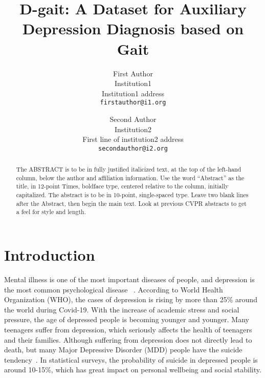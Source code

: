 \documentclass[10pt,twocolumn,letterpaper]{article}
\def\confName{CVPR}
\begin{document}
\title{D-gait: A Dataset for Auxiliary Depression Diagnosis based on Gait}

\author{First Author\\
Institution1\\
Institution1 address\\
{\tt\small firstauthor@i1.org}
\and
Second Author\\
Institution2\\
First line of institution2 address\\
{\tt\small secondauthor@i2.org}
}
\maketitle

\begin{abstract}
   The ABSTRACT is to be in fully justified italicized text, at the top of the left-hand column, below the author and affiliation information.
   Use the word ``Abstract'' as the title, in 12-point Times, boldface type, centered relative to the column, initially capitalized.
   The abstract is to be in 10-point, single-spaced type.
   Leave two blank lines after the Abstract, then begin the main text.
   Look at previous CVPR abstracts to get a feel for style and length.
\end{abstract}

\section{Introduction}
\label{sec:intro}

Mental illness is one of the most important diseases of people, and depression is the most common psychological disease ~\cite{world2017depression,bhugra2004globalisation,rao2008understanding}.
According to World Health Organization (WHO), the cases of depression is rising by more than 25\% around the world during Covid-19. With the increase of academic stress and social pressure, the age of depressed people is becoming younger and younger. Many teenagers suffer from depression, which seriously affects the health of teenagers and their families.
Although suffering from depression does not directly lead to death, but many Major Depressive Disorder (MDD) people have the suicide tendency~\cite{eisenberg2007prevalence,bergfeld2018treatment,hemming2019alexithymia}.
In statistical surveys, the probability of suicide in depressed people is around 10-15\%, which has great impact on personal wellbeing and social stability.
\end{document}
